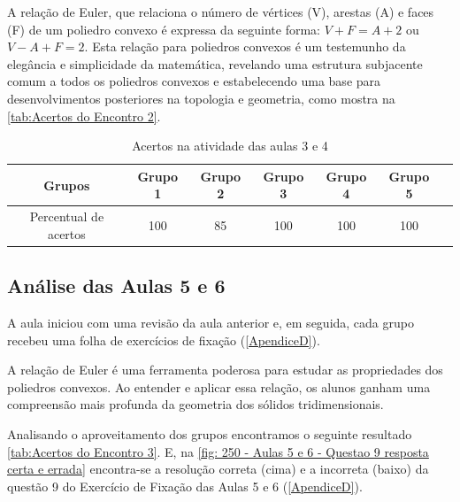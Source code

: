 A relação de Euler, que relaciona o número de vértices (V), arestas (A) e faces (F) de um poliedro convexo é expressa da seguinte forma: $V + F = A + 2$ ou $V - A + F = 2$. Esta relação para poliedros convexos é um testemunho da elegância e simplicidade da matemática, revelando uma estrutura subjacente comum a todos os poliedros convexos e estabelecendo uma base para desenvolvimentos posteriores na topologia e geometria, como mostra na \autoref{tab:Acertos do Encontro 2}.

\begin{table}[htbp] \centering
    \caption{Acertos na atividade das aulas 3 e 4} \label{tab:Acertos do Encontro 2} \begin{tabular}{|c|c|c|c|c|c|c|}
        \hline
        \textbf{Grupos}       & \textbf{Grupo 1} & \textbf{Grupo 2} & \textbf{Grupo 3} & \textbf{Grupo 4} & \textbf{Grupo 5} \\
        \hline
        Percentual de acertos & 100              & 85               & 100              & 100              & 100              \\
        \hline
    \end{tabular}
    \legend{\legendaTabela}
\end{table}

\subsection{Análise das Aulas 5 e 6}

A aula iniciou com uma revisão da aula anterior e, em seguida, cada grupo recebeu uma folha de exercícios de fixação (\autoref{ApendiceD}).


A relação de Euler é uma ferramenta poderosa para estudar as propriedades dos poliedros convexos. Ao entender e aplicar essa relação, os alunos ganham uma compreensão mais profunda da geometria dos sólidos tridimensionais.

Analisando o aproveitamento dos grupos encontramos o seguinte resultado \autoref{tab:Acertos do Encontro 3}. E, na \autoref{fig: 250 - Aulas 5 e 6 - Questao 9 resposta certa e errada} encontra-se a resolução correta (cima) e a incorreta (baixo) da questão 9 do Exercício de Fixação das Aulas 5 e 6 (\autoref{ApendiceD}).

